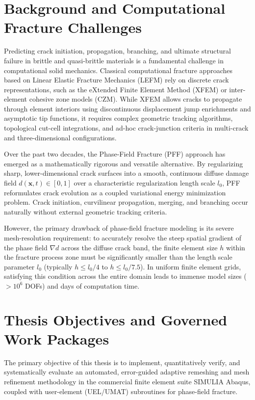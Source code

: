 \documentclass[11pt,a4paper]{report}
\begin{document}
\section{Background and Computational Fracture Challenges}
Predicting crack initiation, propagation, branching, and ultimate structural failure in brittle and quasi-brittle materials is a fundamental challenge in computational solid mechanics. Classical computational fracture approaches based on Linear Elastic Fracture Mechanics (LEFM) rely on discrete crack representations, such as the eXtended Finite Element Method (XFEM) or inter-element cohesive zone models (CZM). While XFEM allows cracks to propagate through element interiors using discontinuous displacement jump enrichments and asymptotic tip functions, it requires complex geometric tracking algorithms, topological cut-cell integrations, and ad-hoc crack-junction criteria in multi-crack and three-dimensional configurations.

Over the past two decades, the Phase-Field Fracture (PFF) approach \cite{bourdin2000, miehe2010} has emerged as a mathematically rigorous and versatile alternative. By regularizing sharp, lower-dimensional crack surfaces into a smooth, continuous diffuse damage field $d(\mathbf{x}, t) \in [0, 1]$ over a characteristic regularization length scale $l_0$, PFF reformulates crack evolution as a coupled variational energy minimization problem. Crack initiation, curvilinear propagation, merging, and branching occur naturally without external geometric tracking criteria.

However, the primary drawback of phase-field fracture modeling is its severe mesh-resolution requirement: to accurately resolve the steep spatial gradient of the phase field $\nabla d$ across the diffuse crack band, the finite element size $h$ within the fracture process zone must be significantly smaller than the length scale parameter $l_0$ (typically $h \le l_0 / 4$ to $h \le l_0 / 7.5$). In uniform finite element grids, satisfying this condition across the entire domain leads to immense model sizes ($>10^6$ DOFs) and days of computation time.

\section{Thesis Objectives and Governed Work Packages}
The primary objective of this thesis is to implement, quantitatively verify, and systematically evaluate an automated, error-guided adaptive remeshing and mesh refinement methodology in the commercial finite element suite SIMULIA Abaqus, coupled with user-element (UEL/UMAT) subroutines for phase-field fracture.
\end{document}
